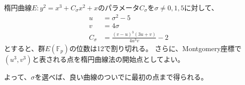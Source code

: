 \begin{Theo}{}{}
楕円曲線$E:y^2=x^3+C_{\sigma}x^2+x$のパラメータ$C_{\sigma}$を$\sigma\neq0,1,5$に対して、
\begin{align*}
u &= \sigma^2 - 5\\
v &= 4\sigma\\
C_{\sigma} &= \frac{(v - u)^3(3u+v)}{4u^3v} - 2
\end{align*}
とすると、群$E(\mathbb{F}_p)$の位数は12で割り切れる。
さらに、Montgomery座標で$(u^3,v^3)$と表される点を楕円曲線法の開始点としてよい。
\end{Theo}

よって、$\sigma$を選べば、良い曲線のついでに最初の点まで得られる。

